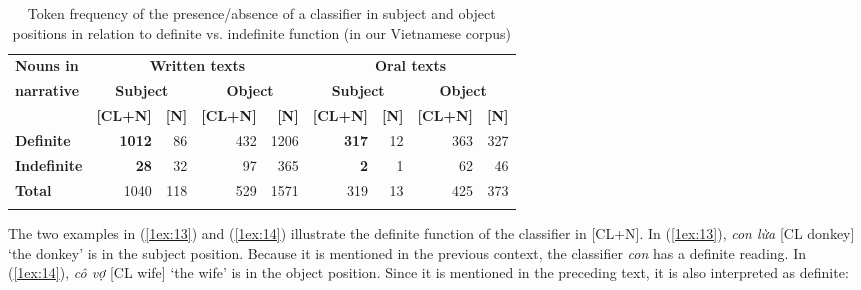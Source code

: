 \documentclass[output=paper]{langsci/langscibook}
\begin{document}
\begin{table}
{\small{
\begin{tabularx}{\textwidth}{Xrrrrrrrr}%
\lsptoprule
{\textbf{Nouns in}}  & \multicolumn{4}{c}{\textbf{Written texts}} & \multicolumn{4}{c}{{\textbf{Oral texts}}} \\
\cmidrule{2-9}
{\textbf{narrative}} & \multicolumn{2}{c}{\textbf{Subject}} & \multicolumn{2}{c}{\textbf{Object}} & \multicolumn{2}{c}{\textbf{Subject}} & \multicolumn{2}{c}{\textbf{Object}} \\
 & {\textbf{[CL+N]}} & {\textbf{[N]}} & {\textbf{[CL+N]}} & {\textbf{[N]}} & {\textbf{[CL+N]}} & {\textbf{[N]}} & {\textbf{[CL+N]}} & {\textbf{[N]}} \\
\cmidrule{2-9}
{\textbf{Definite}} & {\textbf{1012}} & 86 & 432 & 1206 & {\textbf{317}} & 12 & 363 & 327 \\
{\textbf{Indefinite}} & {\textbf{28}} & 32 & 97 & 365 & {\textbf{2}} & 1 & 62 & 46 \\
{\textbf{Total}} & 1040 & 118 & 529 & 1571 & 319 & 13 & 425 & 373 \\
\lspbottomrule
\end{tabularx}
}}
\caption{Token frequency of the presence/absence of a classifier in subject and object positions in relation to definite vs. indefinite function (in our Vietnamese corpus)}\label{1table:4}
\end{table}

\largerpage
The two examples in (\ref{1ex:13}) and (\ref{1ex:14}) illustrate the definite function of the classifier in [CL+N]. In (\ref{1ex:13}), {\emph{con lừa}} [CL donkey] `the donkey' is in the subject position. Because it is mentioned in the previous context, the classifier {\emph{con}} has a definite reading. In (\ref{1ex:14}), {\emph{cô vợ}} [CL wife] `the wife' is in the object position. Since it is mentioned in the preceding text, it is also interpreted as definite:
\end{document}
